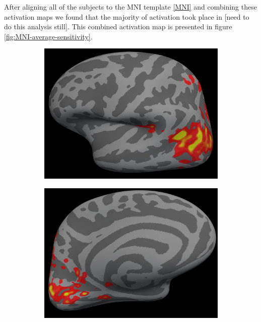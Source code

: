 \documentclass[preprint,5p,authoryear]{elsarticle}
\begin{document}
After aligning all of the subjects to the MNI template \ref{MNI} and combining these activation maps we found that the majority of activation took place in [need to do this analysis still].
This combined activation map is presented in figure \ref{fig:MNI-average-sensitivity}.

\begin{figure}
\centering
\begin{subfigure}{0.4\textwidth}
\centering
\includegraphics[width=\textwidth]{figures/lh-lateral-smax-average}
\caption{}
\label{fig:lh-lateral-smax-average}
\end{subfigure}
\begin{subfigure}{0.4\textwidth}
\centering
\includegraphics[width=\textwidth]{figures/lh-medial-smax-average}

\end{subfigure}
\end{figure}
\end{document}
